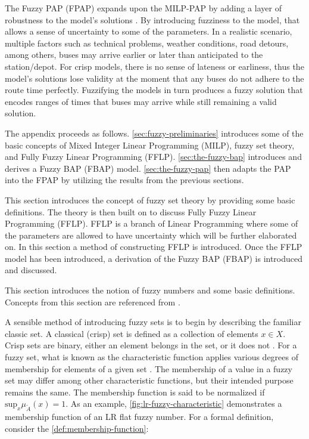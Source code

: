 \documentclass[ee,thesis]{usuthesis}
\begin{document}
The Fuzzy PAP (FPAP) expands upon the MILP-PAP by adding a layer of robustness to the model's solutions
\cite{bello-2019-fuzzy-activ,kaur-2016-introd-fuzzy}. By introducing fuzziness to the model, that allows a sense of
uncertainty to some of the parameters. In a realistic scenario, multiple factors such as technical problems, weather
conditions, road detours, among others, buses may arrive earlier or later than anticipated to the station/depot. For
crisp models, there is no sense of lateness or earliness, thus the model's solutions lose validity at the moment that
any buses do not adhere to the route time perfectly. Fuzzifying the models in turn produces a fuzzy solution that
encodes ranges of times that buses may arrive while still remaining a valid solution.

The appendix proceeds as follows. \ref{sec:fuzzy-preliminaries} introduces some of the basic concepts of Mixed Integer
Linear Programming (MILP), fuzzy set theory, and Fully Fuzzy Linear Programming (FFLP). \ref{sec:the-fuzzy-bap}
introduces and derives a Fuzzy BAP (FBAP) model. \ref{sec:the-fuzzy-pap} then adapts the PAP into the FPAP by utilizing
the results from the previous sections.

\label{sec:fuzzy-preliminaries}

This section introduces the concept of fuzzy set theory by providing some basic definitions. The theory is then built on to discuss Fully Fuzzy Linear Programming (FFLP). FFLP is a branch of Linear Programming where some of the parameters are allowed to have uncertainty which will be further elaborated on. In this section a method of constructing FFLP is introduced. Once the FFLP model has been introduced, a derivation of the Fuzzy BAP (FBAP) is introduced and discussed.

\label{sec:fuzzy-set-theory}
This section introduces the notion of fuzzy numbers and some basic definitions. Concepts from this section are
referenced from
\cite{zimmermann-2001-fuzzy-set,das-2016-mathem-model,yaghobi-2014-compar-fuzzy,bello-2019-fuzzy-activ,kaur-2016-introd-fuzzy}.

\label{sec:fuzzy-sets}
A sensible method of introducing fuzzy sets is to begin by describing the familiar classic set. A classical (crisp) set
is defined as a collection of elements \(x \in X\). Crisp sets are binary, either an element belongs in the set, or it does
not \cite{zimmermann-2001-fuzzy-set}. For a fuzzy set, what is known as the characteristic function applies various
degrees of membership for elements of a given set \cite{zimmermann-2001-fuzzy-set}. The membership of a value in a
fuzzy set may differ among other characteristic functions, but their intended purpose remains the same. The
membership function is said to be normalized if \(\text{sup}_x \mu_{\tilde{A}}(x) = 1\). As an example,
\ref{fig:lr-fuzzy-characteristic} demonstrates a membership function of an LR flat fuzzy number. For a formal definition, consider
the \ref{def:membership-function}:
\end{document}
